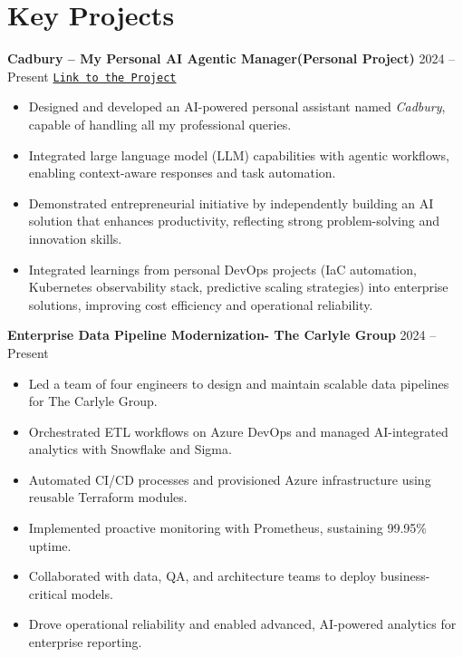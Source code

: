 \documentclass[a4paper,10pt]{article}
\begin{document}
\section*{Key Projects}
\textbf{ Cadbury – My Personal AI Agentic Manager(Personal Project) } \hfill 2024 -- Present   
\href{https://huggingface.co/spaces/ashranbaig/Cadbury-My-Manager}{\texttt{Link to the Project}}  
\begin{itemize}[leftmargin=*]
  \item Designed and developed an AI-powered personal assistant named \emph{Cadbury}, capable of handling all my professional queries.
  \item Integrated large language model (LLM) capabilities with agentic workflows, enabling context-aware responses and task automation.  
  \item Demonstrated entrepreneurial initiative by independently building an AI solution that enhances productivity, reflecting strong problem-solving and innovation skills.
  \item {Integrated learnings from personal DevOps projects (IaC automation, Kubernetes observability stack, predictive scaling strategies) into enterprise solutions, improving cost efficiency and operational reliability.}

\end{itemize}


\textbf{ Enterprise Data Pipeline Modernization- The Carlyle Group } \hfill 2024 -- Present  

\begin{itemize}[leftmargin=*]

  \item Led a team of four engineers to design and maintain scalable data pipelines for The Carlyle Group.
  \item Orchestrated ETL workflows on Azure DevOps and managed AI-integrated analytics with Snowflake and Sigma.
  \item Automated CI/CD processes and provisioned Azure infrastructure using reusable Terraform modules.
  \item Implemented proactive monitoring with Prometheus, sustaining 99.95\% uptime.
  \item Collaborated with data, QA, and architecture teams to deploy business-critical models.
  \item Drove operational reliability and enabled advanced, AI-powered analytics for enterprise reporting.
\end{itemize}
\end{document}
